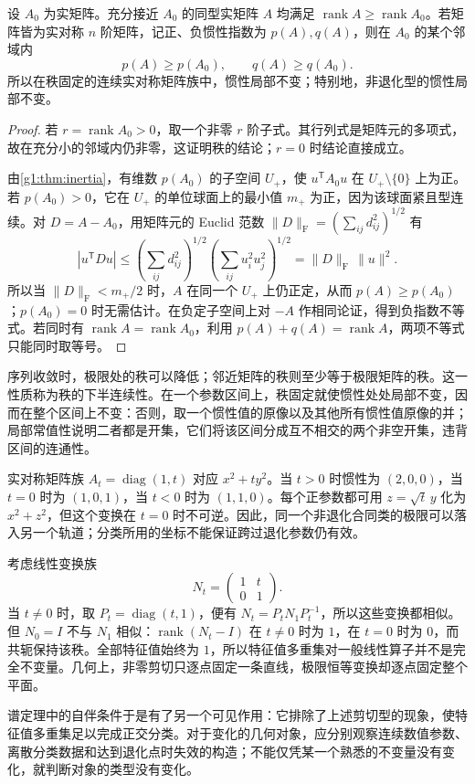 \begin{proposition}\label{g1:prop:rank-inertia-continuity}
	设 \(A_0\) 为实矩阵。充分接近 \(A_0\) 的同型实矩阵 \(A\) 均满足 \(\operatorname{rank}A\ge\operatorname{rank}A_0\)。若矩阵皆为实对称 \(n\) 阶矩阵，记正、负惯性指数为 \(p(A),q(A)\)，则在 \(A_0\) 的某个邻域内
	\[
		p(A)\ge p(A_0),\qquad q(A)\ge q(A_0).
	\]
	所以在秩固定的连续实对称矩阵族中，惯性局部不变；特别地，非退化型的惯性局部不变。
\end{proposition}
\begin{proof}
	若 \(r=\operatorname{rank}A_0>0\)，取一个非零 \(r\) 阶子式。其行列式是矩阵元的多项式，故在充分小的邻域内仍非零，这证明秩的结论；\(r=0\) 时结论直接成立。

	由\cref{g1:thm:inertia}，有维数 \(p(A_0)\) 的子空间 \(U_+\)，使 \(u^{\mathsf T}A_0u\) 在 \(U_+\setminus\{0\}\) 上为正。若 \(p(A_0)>0\)，它在 \(U_+\) 的单位球面上的最小值 \(m_+\) 为正，因为该球面紧且型连续。对 \(D=A-A_0\)，用矩阵元的 Euclid 范数 \(\lVert D\rVert_{\mathrm F}=(\sum_{ij}d_{ij}^2)^{1/2}\) 有
	\[
		|u^{\mathsf T}Du|
		\le\left(\sum_{ij}d_{ij}^2\right)^{1/2}
		\left(\sum_{ij}u_i^2u_j^2\right)^{1/2}
		=\lVert D\rVert_{\mathrm F}\,\lVert u\rVert^2.
	\]
	所以当 \(\lVert D\rVert_{\mathrm F}<m_+/2\) 时，\(A\) 在同一个 \(U_+\) 上仍正定，从而 \(p(A)\ge p(A_0)\)；\(p(A_0)=0\) 时无需估计。在负定子空间上对 \(-A\) 作相同论证，得到负指数不等式。若同时有 \(\operatorname{rank}A=\operatorname{rank}A_0\)，利用 \(p(A)+q(A)=\operatorname{rank}A\)，两项不等式只能同时取等号。
\end{proof}

序列收敛时，极限处的秩可以降低；邻近矩阵的秩则至少等于极限矩阵的秩。这一性质称为秩的下半连续性。在一个参数区间上，秩固定就使惯性处处局部不变，因而在整个区间上不变：否则，取一个惯性值的原像以及其他所有惯性值原像的并；局部常值性说明二者都是开集，它们将该区间分成互不相交的两个非空开集，违背区间的连通性。

\begin{example}\label{g1:exm:degenerating-form}
	实对称矩阵族 \(A_t=\operatorname{diag}(1,t)\) 对应 \(x^2+ty^2\)。当 \(t>0\) 时惯性为 \((2,0,0)\)，当 \(t=0\) 时为 \((1,0,1)\)，当 \(t<0\) 时为 \((1,1,0)\)。每个正参数都可用 \(z=\sqrt t\,y\) 化为 \(x^2+z^2\)，但这个变换在 \(t=0\) 时不可逆。因此，同一个非退化合同类的极限可以落入另一个轨道；分类所用的坐标不能保证跨过退化参数仍有效。
\end{example}

\begin{example}\label{g1:exm:shear-degeneration}
	考虑线性变换族
	\[
		N_t=\begin{pmatrix}1&t\\0&1\end{pmatrix}.
	\]
	当 \(t\ne0\) 时，取 \(P_t=\operatorname{diag}(t,1)\)，便有 \(N_t=P_tN_1P_t^{-1}\)，所以这些变换都相似。但 \(N_0=I\) 不与 \(N_1\) 相似：\(\operatorname{rank}(N_t-I)\) 在 \(t\ne0\) 时为 \(1\)，在 \(t=0\) 时为 \(0\)，而共轭保持该秩。全部特征值始终为 \(1\)，所以特征值多重集对一般线性算子并不是完全不变量。几何上，非零剪切只逐点固定一条直线，极限恒等变换却逐点固定整个平面。
\end{example}

谱定理中的自伴条件于是有了另一个可见作用：它排除了上述剪切型的现象，使特征值多重集足以完成正交分类。对于变化的几何对象，应分别观察连续数值参数、离散分类数据和达到退化点时失效的构造；不能仅凭某一个熟悉的不变量没有变化，就判断对象的类型没有变化。
